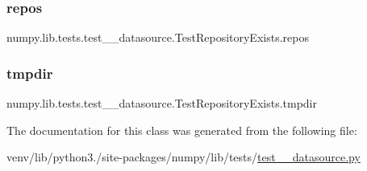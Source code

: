 \subsubsection{\texorpdfstring{repos}{repos}}
{\footnotesize\ttfamily numpy.\+lib.\+tests.\+test\+\_\+\+\_\+datasource.\+Test\+Repository\+Exists.\+repos}

\mbox{\label{classnumpy_1_1lib_1_1tests_1_1test____datasource_1_1TestRepositoryExists_a57361dc455b8598a88a112b7aec271e1}} 
\subsubsection{\texorpdfstring{tmpdir}{tmpdir}}
{\footnotesize\ttfamily numpy.\+lib.\+tests.\+test\+\_\+\+\_\+datasource.\+Test\+Repository\+Exists.\+tmpdir}



The documentation for this class was generated from the following file\+:\begin{DoxyCompactItemize}
\item 
venv/lib/python3./site-\/packages/numpy/lib/tests/\hyperlink{test____datasource_8py}{test\+\_\+\+\_\+datasource.\+py}\end{DoxyCompactItemize}
